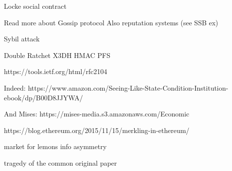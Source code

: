\documentclass[12pt]{report}
\begin{document}
Locke social contract

Read more about Gossip protocol
Also reputation systems (see SSB ex)

Sybil attack

Double Ratchet X3DH HMAC PFS

https://tools.ietf.org/html/rfc2104

Indeed: https://www.amazon.com/Seeing-Like-State-Condition-Institution-ebook/dp/B00D8JJYWA/

And Mises: https://mises-media.s3.amazonaws.com/Economic%

https://blog.ethereum.org/2015/11/15/merkling-in-ethereum/

market for lemons info asymmetry

tragedy of the common original paper
\end{document}
